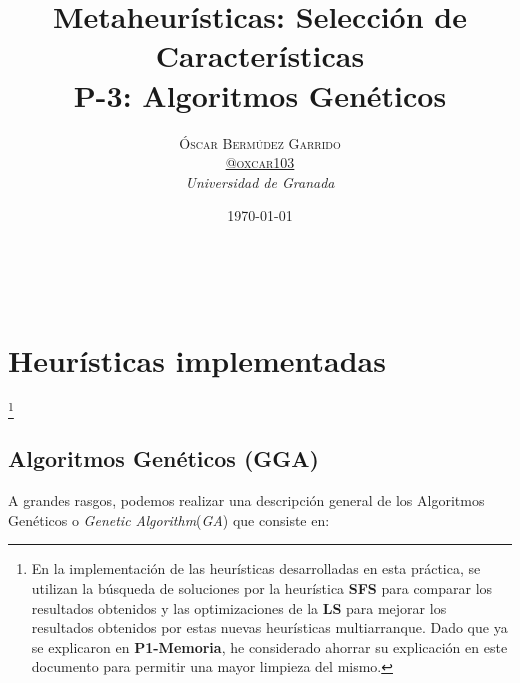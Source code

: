 \documentclass[a4paper, 11pt]{article}
\title{\textbf{Metaheurísticas: Selección de Características}\\ %
P-3: Algoritmos Genéticos} %
\author{\textsc{Óscar Bermúdez Garrido\\
\href{http://www.github.com/oxcar103}{@oxcar103}} %
\\{\textit{Universidad de Granada}}} %
\date{\today} %
\makeatletter
\renewcommand{\maketitle}{
  \begin{flushright} %
  {\LARGE\@title} %
  
  \vspace{50pt} %
  
  {\large\@author} %
  \\\@date %
  \vspace{40pt} %
  \end{flushright}
}
\makeatother
\begin{document}
\maketitle %

\renewcommand{\abstractname}{Resumen} %



{\parskip=2pt
  \tableofcontents
}
\pagebreak

	
	
	
	\section{Heurísticas implementadas}\footnote{En la implementación de las heurísticas desarrolladas
	en esta práctica, se utilizan la búsqueda de soluciones por la heurística \textbf{SFS} para comparar
	los resultados obtenidos y las optimizaciones de la \textbf{LS} para mejorar los resultados obtenidos
	por estas nuevas heurísticas multiarranque. Dado que ya se explicaron en \textbf{P1-Memoria}, he
	considerado ahorrar su explicación en este documento para permitir una mayor limpieza del mismo.}
	
		\subsection{Algoritmos Genéticos (\textbf{GGA})}
			A grandes rasgos, podemos realizar una descripción general de los Algoritmos Genéticos o
			\textit{Genetic Algorithm}(\textit{GA}) que consiste en:
			
\end{document}
